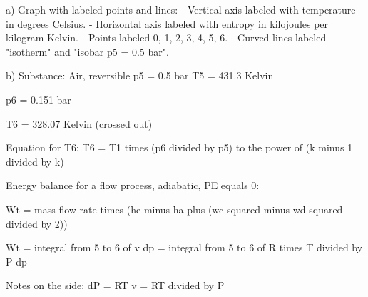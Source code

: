 a)  
Graph with labeled points and lines:  
- Vertical axis labeled with temperature in degrees Celsius.  
- Horizontal axis labeled with entropy in kilojoules per kilogram Kelvin.  
- Points labeled 0, 1, 2, 3, 4, 5, 6.  
- Curved lines labeled "isotherm" and "isobar p5 = 0.5 bar".  

b)  
Substance: Air, reversible  
p5 = 0.5 bar  
T5 = 431.3 Kelvin  

p6 = 0.151 bar  

T6 = 328.07 Kelvin (crossed out)  

Equation for T6:  
T6 = T1 times (p6 divided by p5) to the power of (k minus 1 divided by k)  

Energy balance for a flow process, adiabatic, PE equals 0:  

Wt = mass flow rate times (he minus ha plus (wc squared minus wd squared divided by 2))  

Wt = integral from 5 to 6 of v dp = integral from 5 to 6 of R times T divided by P dp  

Notes on the side:  
dP = RT  
v = RT divided by P